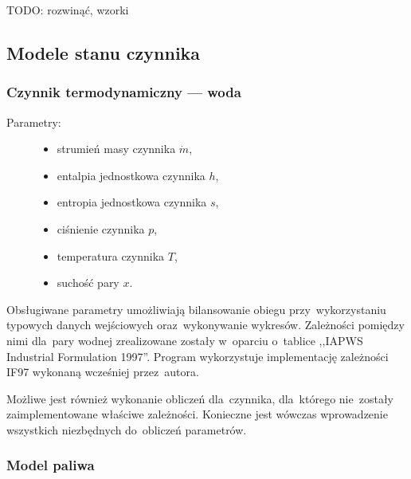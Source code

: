 TODO: rozwinąć, wzorki


\subsection{Modele stanu czynnika}

\subsubsection{Czynnik termodynamiczny --- woda}

\begin{description}

	\item[Parametry:] \hfill

		\begin{itemize}

			\item strumień masy czynnika $\dot m$,

			\item entalpia jednostkowa czynnika $h$,

			\item entropia jednostkowa czynnika $s$,

			\item ciśnienie czynnika $p$,

			\item temperatura czynnika $T$,

			\item suchość pary $x$.

		\end{itemize}

\end{description}

Obsługiwane parametry umożliwiają bilansowanie obiegu przy~wykorzystaniu
typowych danych wejściowych oraz~wykonywanie wykresów. Zależności
pomiędzy nimi dla~pary wodnej zrealizowane zostały w~oparciu o~tablice
,,IAPWS Industrial Formulation 1997''. Program wykorzystuje
implementację zależności IF97 wykonaną wcześniej przez~autora.

Możliwe jest również wykonanie obliczeń dla~czynnika, dla~którego
nie~zostały zaimplementowane właściwe zależności. Konieczne jest wówczas
wprowadzenie wszystkich niezbędnych do~obliczeń parametrów.


\subsubsection{Model paliwa}


